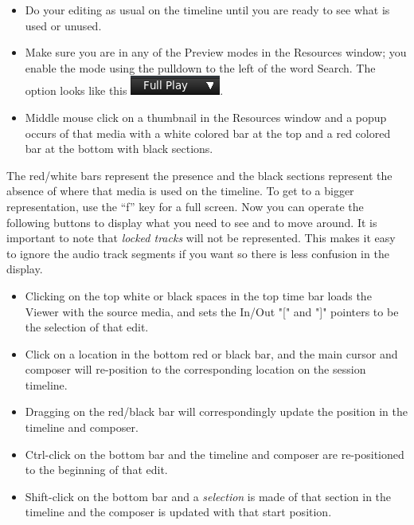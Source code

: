 \begin{itemize}
    \item Do your editing as usual on the timeline until you are ready to see what is used or unused.
    \item Make sure you are in any of the Preview modes in the Resources window; you enable the mode using the pulldown to the left of the word Search.  The option looks like this
    \quad \includegraphics[height=\baselineskip]{images/fullplay.png}.   \item Middle mouse click on a thumbnail in the Resources window and a popup occurs of that media with a
    white colored bar at the top and a red colored bar at the bottom with black sections.
\end{itemize}

The red/white bars represent the presence and the black sections represent the absence of where that media is used on the timeline.  To get to a bigger representation, use the “f” key for a full screen.  Now
you can operate the following buttons to display what you need to see and to move around.  It is important to note that \textit{locked tracks} will not be represented.  This makes it easy to ignore the audio track segments if you want so there is less confusion in the display.
\begin{itemize}
    \item Clicking on the top white or black spaces in the top time bar loads the Viewer with the source media,
    and sets the In/Out "[" and "]" pointers to be the selection of that edit.
    \item Click on a location in the bottom red or black bar, and the main cursor and composer will re-position
    to the corresponding location on the session timeline.
    \item Dragging on the red/black bar will correspondingly update the position in the timeline and composer.
    \item Ctrl-click on the bottom bar and the timeline and composer are re-positioned to the beginning of that
    edit.
    \item Shift-click on the bottom bar and a \textit{selection} is made of that section in the timeline and the composer
    is updated with that start position.
\end{itemize}

